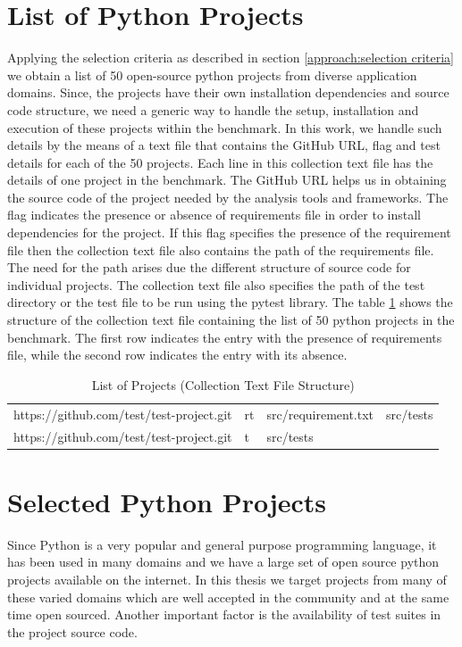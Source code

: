 \section{List of Python Projects}
\label{approach:list of projects}
Applying the selection criteria as described in section \ref{approach:selection criteria} we obtain a list of 50 open-source python projects from diverse application domains. Since, the projects have their own installation dependencies and source code structure, we need a generic way to handle the setup, installation and execution of these projects within the benchmark. In this work, we handle such details by the means of a text file that contains the GitHub URL, flag and test details for each of the 50 projects. Each line in this collection text file has the details of one project in the benchmark. The GitHub URL helps us in obtaining the source code of the project needed by the analysis tools and frameworks. The flag indicates the presence or absence of requirements file in order to install dependencies for the project. If this flag specifies the presence of the requirement file then the collection text file also contains the path of the requirements file. The need for the path arises due the different structure of source code for individual projects. The collection text file also specifies the path of the test directory or the test file to be run using the pytest library. The table \ref{table:list of projects} shows the structure of the collection text file containing the list of 50 python projects in the benchmark. The first row indicates the entry with the presence of requirements file, while the second row indicates the entry with its absence.

\begin{table}[ht]
    \centering
    \begin{tabular}{llll}
    \hline
    https://github.com/test/test-project.git    & rt    & src/requirement.txt   & src/tests\\
    https://github.com/test/test-project.git    & t    & src/tests\\
    \hline
    \end{tabular}
    \caption{List of Projects (Collection Text File Structure)}
    \label{table:list of projects}
\end{table}

\section{Selected Python Projects}
\label{approach:selection of projects}
Since Python is a very popular and general purpose programming language, it has been used in many domains and we have a large set of open source python projects available on the internet. In this thesis we target projects from many of these varied domains which are well accepted in the community and at the same time open sourced. Another important factor is the availability of test suites in the project source code. 

